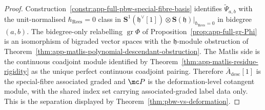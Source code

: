 \begin{proof}
  Construction~\ref{constr:app-full-pbw-special-fibre-basis} identifies
  \(\widetilde\Psi_{a,b}\) with the unit-normalised \(\hbar_{\mathrm{Rees}}=0\) class in
  \(\mathbf S^1(\mathfrak h^\vee[1])\otimes\mathbf S(\mathfrak h)|_{\hbar_{\mathrm{Rees}}=0}\)
  in bidegree \((a,b)\).  The bidegree-only relabelling
  \(\operatorname{gr}\Phi\) of
  Proposition~\ref{prop:app-full-gr-Phi} is an isomorphism of bigraded
  vector spaces with the \(\mathfrak h\)-module obstruction of
  Theorem~\ref{thm:app-matlis-polynomial-descendant-obstruction}.
  The Matlis side is the continuous coadjoint module
  identified by Theorem~\ref{thm:app-matlis-residue-rigidity} as the
  unique perfect continuous coadjoint pairing.  Therefore
  \(\bar A_{\mathrm{desc}}[1]\) is the special-fibre associated graded and
  \(\mc P\) is the deformation-level cotangent module, with the shared
  index set carrying associated-graded label data only.  This is the
  separation displayed by Theorem~\ref{thm:pbw-vs-deformation}.
\end{proof}
